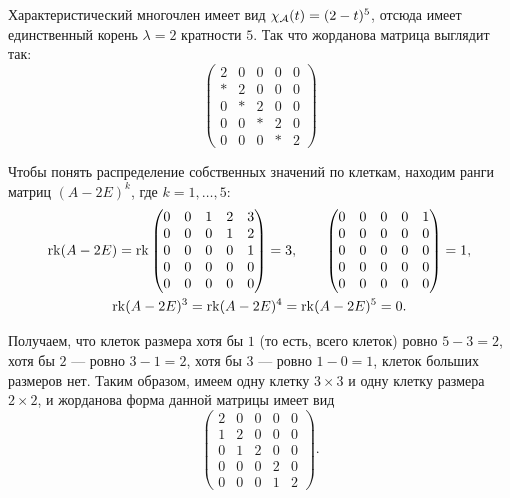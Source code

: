 \begin{solution}
	Характеристический многочлен имеет вид $\chi_{\mathcal{A}}(t) = (2 - t)^5$, отсюда имеет единственный корень $\lambda = 2$ кратности $5$. Так что жорданова матрица выглядит так:
	\[
		\begin{pmatrix}
			2 & 0 & 0 & 0 & 0\\
			\ast & 2 & 0 & 0 & 0\\
			0 & \ast & 2 & 0 & 0\\
			0 & 0 & \ast & 2 & 0\\
			0 & 0 & 0 & \ast & 2
		\end{pmatrix}
	\]

	Чтобы понять распределение собственных значений по клеткам, находим ранги матриц $(A - 2E)^k$, где $k = 1, \ldots, 5$:
	\begin{gather*}
		\operatorname{rk}(A - 2E) = \operatorname{rk}
		\begin{pmatrix}
			0 & 0 & 1 & 2 & 3\\
			0 & 0 & 0 & 1 & 2\\
			0 & 0 & 0 & 0 & 1\\
			0 & 0 & 0 & 0 & 0\\
			0 & 0 & 0 & 0 & 0
		\end{pmatrix} = 3,\qquad
		\begin{pmatrix}
			0 & 0 & 0 & 0 & 1\\
			0 & 0 & 0 & 0 & 0\\
			0 & 0 & 0 & 0 & 0\\
			0 & 0 & 0 & 0 & 0\\
			0 & 0 & 0 & 0 & 0
		\end{pmatrix} = 1,\\
		\operatorname{rk}(A - 2E)^3 = \operatorname{rk}(A - 2E)^4 = \operatorname{rk}(A - 2E)^5 = 0.
	\end{gather*}

	Получаем, что клеток размера хотя бы $1$ (то есть, всего клеток) ровно $5 - 3 = 2$, хотя бы $2$ --- ровно $3 - 1 = 2$, хотя бы $3$ --- ровно $1 - 0 = 1$, клеток больших размеров нет. Таким образом, имеем одну клетку $3 \times 3$ и одну клетку размера $2 \times 2$, и жорданова форма данной матрицы имеет вид
	\[
		\begin{pmatrix}
			2 & 0 & 0 & 0 & 0\\
			1 & 2 & 0 & 0 & 0\\
			0 & 1 & 2 & 0 & 0\\
			0 & 0 & 0 & 2 & 0\\
			0 & 0 & 0 & 1 & 2
		\end{pmatrix}.
	\]
\end{solution}

